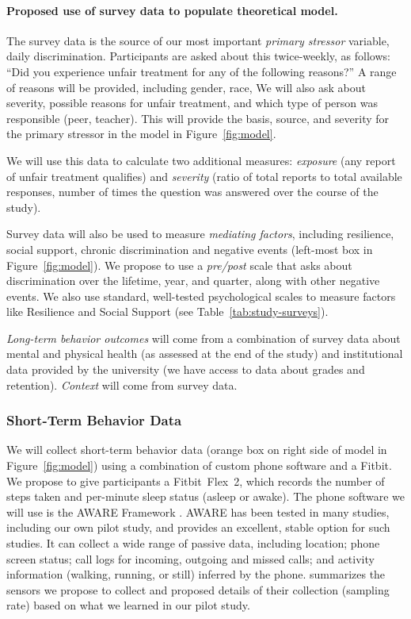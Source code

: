 \paragraph{Proposed use of survey data to populate theoretical model.} 
The survey data is the source of our most important \textit{primary stressor} variable, daily discrimination. Participants are asked about this twice-weekly, as follows: ``Did you experience unfair treatment for any of the following reasons?'' A range of reasons will be provided, including gender, race, \etc We will also ask about severity, possible reasons for unfair treatment, and which type of person was responsible (\eg peer, teacher). This will provide the basis, source, and severity for the primary stressor in the model in Figure~\ref{fig:model}.

We will use this data to calculate two additional measures:  \textit{exposure} (any report of unfair treatment qualifies) and \textit{severity} (ratio of total reports to total available responses, \ie number of times the question was answered over the course of the study). 

Survey data will also be used to measure \textit{mediating factors}, including resilience, social support, chronic discrimination and negative events (left-most box in Figure~\ref{fig:model}). We propose to use a  \textit{pre/post} scale that asks about discrimination over the lifetime, year, and quarter, along with other negative events. We also use standard, well-tested psychological scales to measure factors like Resilience and Social Support (see Table~\ref{tab:study-surveys}). 

\textit{Long-term behavior outcomes} will come from a combination of survey data about mental and physical health (as assessed at the end of the study) and institutional data provided by the university (we have access to data about grades and retention). \textit{Context} will come from survey data.

\subsubsection{Short-Term Behavior Data}
We will collect short-term behavior data (orange box on right side of model in Figure~\ref{fig:model}) using a combination of custom phone software and a Fitbit. We propose to give participants a Fitbit~Flex~2, which records the number of steps taken and per-minute sleep status (\eg asleep or awake). The phone software we will use is the AWARE Framework \cite{Ferreira:2015}. AWARE has been tested in many studies, including our own pilot study, and provides an excellent, stable option for such studies. It can collect a wide range of passive data, including  
location; phone screen status; call logs for incoming, outgoing and missed calls; and activity information (\eg walking, running, or still) inferred by the phone. 
 summarizes the sensors we propose to collect and proposed details of their collection (\eg sampling rate) based on what we learned in our pilot study. 

